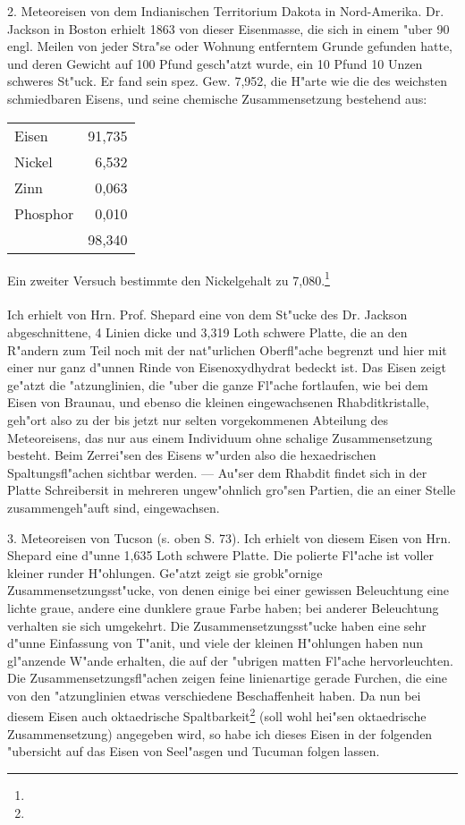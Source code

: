 \documentclass[a4paper, 11pt, oneside]{article}
\begin{document}
2. Meteoreisen von dem Indianischen Territorium Dakota in Nord-Amerika. Dr. Jackson in Boston erhielt 1863 von dieser Eisenmasse, die sich in einem "uber 90 engl. Meilen von jeder Stra"se oder Wohnung entferntem Grunde gefunden hatte, und deren Gewicht auf 100 Pfund gesch"atzt wurde, ein 10 Pfund 10 Unzen schweres St"uck. Er fand sein spez. Gew. 7,952, die H"arte wie die des weichsten schmiedbaren Eisens, und seine chemische Zusammensetzung bestehend aus:
\begin{center}
\begin{tabular}{ l r }
    Eisen & 91,735\\
    Nickel & 6,532\\
    Zinn & 0,063\\
    Phosphor & 0,010\\
     & 98,340\\
\end{tabular}
\end{center}
Ein zweiter Versuch bestimmte den Nickelgehalt zu 7,080.\footnote{}
\paragraph{}
Ich erhielt von Hrn. Prof. Shepard eine von dem St"ucke des Dr. Jackson abgeschnittene, 4 Linien dicke und 3,319 Loth schwere Platte, die an den R"andern zum Teil noch mit der nat"urlichen Oberfl"ache begrenzt und hier mit einer nur ganz d"unnen Rinde von Eisenoxydhydrat bedeckt ist. Das Eisen zeigt ge"atzt die "atzunglinien, die "uber die ganze Fl"ache fortlaufen, wie bei dem Eisen von Braunau, und ebenso die kleinen eingewachsenen Rhabditkristalle, geh"ort also zu der bis jetzt nur selten vorgekommenen Abteilung des Meteoreisens, das nur aus einem Individuum ohne schalige Zusammensetzung besteht. Beim Zerrei"sen des Eisens w"urden also die hexaedrischen Spaltungsfl"achen sichtbar werden. --- Au"ser dem Rhabdit findet sich in der Platte Schreibersit in mehreren ungew"ohnlich gro"sen Partien, die an einer Stelle zusammengeh"auft sind, eingewachsen.

3. Meteoreisen von Tucson (s. oben S. 73). Ich erhielt von diesem Eisen von Hrn. Shepard eine d"unne 1,635 Loth schwere Platte. Die polierte Fl"ache ist voller kleiner runder H"ohlungen. Ge"atzt zeigt sie grobk"ornige Zusammensetzungsst"ucke, von denen einige bei einer gewissen Beleuchtung eine lichte graue, andere eine dunklere graue Farbe haben; bei anderer Beleuchtung verhalten sie sich umgekehrt. Die Zusammensetzungsst"ucke haben eine sehr d"unne Einfassung von T"anit, und viele der kleinen H"ohlungen haben nun gl"anzende W"ande erhalten, die auf der "ubrigen matten Fl"ache hervorleuchten. Die Zusammensetzungsfl"achen zeigen feine linienartige gerade Furchen, die eine von den "atzunglinien etwas verschiedene Beschaffenheit haben. Da nun bei diesem Eisen auch oktaedrische Spaltbarkeit\footnote{} (soll wohl hei"sen oktaedrische Zusammensetzung) angegeben wird, so habe ich dieses Eisen in der folgenden "ubersicht auf das Eisen von Seel"asgen und Tucuman folgen lassen.
\end{document}
